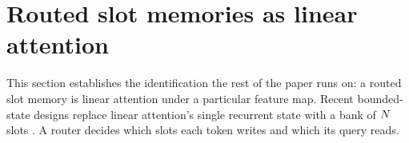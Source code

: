 %
%
%
%
\section{Routed slot memories as linear attention}
\label{sec:reduction}

This section establishes the identification the rest of the paper runs on: a routed slot memory is linear attention under a particular feature map. Recent bounded-state designs replace linear attention's single recurrent state with a bank of $N$ slots \citep{peng2022abc, zhang2024gsa, afzal2026raven, xiao2026ramnet}. A router decides which slots each token writes and which its query reads.

